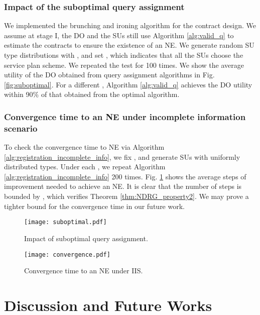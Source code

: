 \documentclass[journal]{IEEEtran}
\begin{document}
\subsubsection{Impact of the suboptimal query assignment}

We implemented the brunching and ironing algorithm \cite{contract_book} for the contract design. We assume at stage I, the DO and the SUs still use Algorithm \ref{alg:valid_q} to estimate the contracts to ensure the existence of an NE. We generate random SU type distributions with ,  and set , which indicates that all the  SUs choose the service plan scheme. We repeated the test for 100 times. We show the average utility of the DO obtained from query assignment algorithms in Fig. \ref{fig:suboptimal}. For a different , Algorithm \ref{alg:valid_q} achieves the DO utility within 90\% of that obtained from the optimal algorithm.

\subsubsection{Convergence time to an NE under incomplete information scenario}

To check the convergence time to NE via Algorithm \ref{alg:registration_incomplete_info}, we fix ,  and generate  SUs with uniformly distributed types. Under each , we repeat Algorithm \ref{alg:registration_incomplete_info} 200 times. Fig. \ref{fig:convergence} shows the average steps of improvement needed to achieve an NE. It is clear that the number of steps is bounded by , which verifies Theorem \ref{thm:NDRG_property2}. We may prove a tighter bound for the convergence time in our future work.

\begin{figure}[tp]
\centering
\begin{minipage}{1.6in}                                     \centering
\texttt{[image: suboptimal.pdf]}          \caption{Impact of suboptimal query assignment.}
\label{fig:suboptimal}
\end{minipage}
\begin{minipage}{1.6in}                                     \centering
\texttt{[image: convergence.pdf]}         \caption{Convergence time to an NE under IIS.}
\label{fig:convergence}
\end{minipage}
\vspace{-0.0cm}
\end{figure}

\section{Discussion and Future Works}
\end{document}
